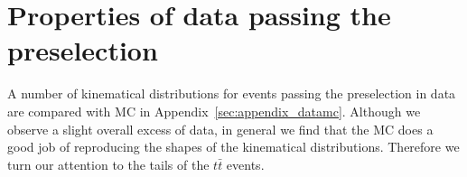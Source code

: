 \section{Properties of data passing the preselection}
\label{sec:bulk}
A number of kinematical distributions for events passing 
the preselection in data are compared with MC in 
Appendix~\ref{sec:appendix_datamc}. Although we observe a
slight overall excess of data, in general we find that
the MC does a good job of reproducing the shapes of the
kinematical distributions.  Therefore
we turn our attention to the tails of the $t\bar{t}$ 
events. 
